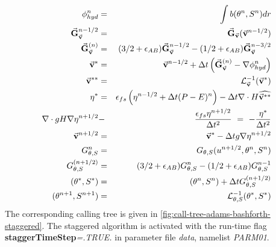 \begin{eqnarray}
\phi^{n}_{hyd} & = & \int b(\theta^{n},S^{n}) dr
\label{eq:phi-hyd-staggered} \\
\vec{\bf G}_{\vec{\bf v}}^{n-1/2} & = & \vec{\bf G}_{\vec{\bf v}} ( \vec{\bf v}^{n-1/2} )
\label{eq:Gv-n-staggered} \\
\vec{\bf G}_{\vec{\bf v}}^{(n)} & = & (3/2 + \epsilon_{AB} ) \vec{\bf G}_{\vec{\bf v}}^{n-1/2} - (1/2 + \epsilon_{AB} ) \vec{\bf G}_{\vec{\bf v}}^{n-3/2}
\label{eq:Gv-n+5-staggered} \\
\vec{\bf v}^{*} & = & \vec{\bf v}^{n-1/2} + \Delta t \left( \vec{\bf G}_{\vec{\bf v}}^{(n)} - \nabla \phi_{hyd}^{n} \right)
\label{eq:vstar-staggered} \\
\vec{\bf v}^{**} & = & {\cal L}_{\vec{\bf v}}^{-1} ( \vec{\bf v}^* )
\label{eq:vstarstar-staggered} \\
\eta^* & = & \epsilon_{fs} \left( \eta^{n-1/2} + \Delta t (P-E)^n \right)- \Delta t 
  \nabla \cdot H \widehat{ \vec{\bf v}^{**} }
\label{eq:nstar-staggered} \\
\nabla \cdot g H \nabla \eta^{n+1/2} & - & \frac{\epsilon_{fs} \eta^{n+1/2}}{\Delta t^2}
~ = ~ - \frac{\eta^*}{\Delta t^2}
\label{eq:elliptic-staggered} \\
\vec{\bf v}^{n+1/2} & = & \vec{\bf v}^{*} - \Delta t g \nabla \eta^{n+1/2}
\label{eq:v-n+1-staggered} \\
G_{\theta,S}^{n} & = & G_{\theta,S} ( u^{n+1/2}, \theta^{n}, S^{n} )
\label{eq:Gt-n-staggered} \\
G_{\theta,S}^{(n+1/2)} & = & (3/2+\epsilon_{AB}) G_{\theta,S}^{n}-(1/2+\epsilon_{AB}) G_{\theta,S}^{n-1}
\label{eq:Gt-n+5-staggered} \\
(\theta^*,S^*) & = & (\theta^{n},S^{n}) + \Delta t G_{\theta,S}^{(n+1/2)}
\label{eq:tstar-staggered} \\
(\theta^{n+1},S^{n+1}) & = & {\cal L}^{-1}_{\theta,S} (\theta^*,S^*)
\label{eq:t-n+1-staggered} \\
\end{eqnarray}
The corresponding calling tree is given in
\ref{fig:call-tree-adams-bashforth-staggered}.
The staggered algorithm is activated with the run-time flag 
{\bf staggerTimeStep}{\em=.TRUE.} in parameter file {\em data},
namelist {\em PARM01}.

